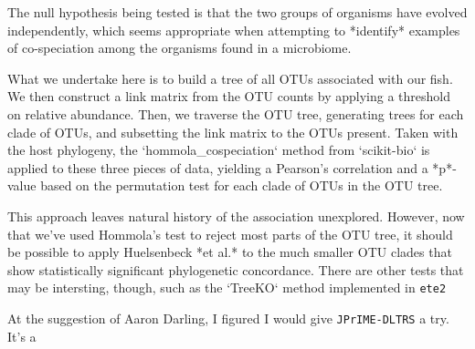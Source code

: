 The null hypothesis being tested is that the two groups of organisms have
evolved independently, which seems appropriate when attempting to *identify*
examples of co-speciation among the organisms found in a microbiome. 

What we undertake here is to build a tree of all OTUs associated with our
fish. We then construct a link matrix from the OTU counts by applying a
threshold on relative abundance. Then, we traverse the OTU tree, generating
trees for each clade of OTUs, and subsetting the link matrix to the OTUs
present. Taken with the host phylogeny, the `hommola_cospeciation` method 
from `scikit-bio` is applied to these three pieces of data, yielding a 
Pearson's correlation and a *p*-value based on the permutation test for 
each clade of OTUs in the OTU tree.

This approach leaves natural history of the association unexplored. However,
now that we've used Hommola's test to reject most parts of the OTU tree, it
should be possible to apply Huelsenbeck *et al.* to the much smaller OTU 
clades that show statistically significant phylogenetic concordance. There
are other tests that may be intersting, though, such as the `TreeKO` method
implemented in {\tt ete2} %


At the suggestion of Aaron Darling, I figured I would give {\tt JPrIME-DLTRS}
a try. It's a 

